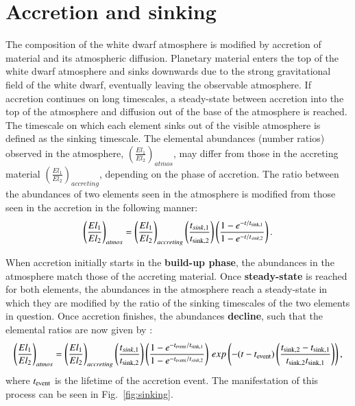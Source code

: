 \documentclass[onecolumn,authoryear]{els-mrw}
\begin{document}
    \section{Accretion and sinking}
The composition of the white dwarf atmosphere is modified by accretion of material and its atmospheric diffusion. Planetary material enters the top of the white dwarf atmosphere and sinks downwards due to the strong gravitational field of the white dwarf, eventually leaving the observable atmosphere. If accretion continues on long timescales, a steady-state between accretion into the top of the atmosphere and diffusion out of the base of the atmosphere is reached. The timescale on which each element sinks out of the visible atmosphere is defined as the sinking timescale. The elemental abundances (number ratios) observed in the atmosphere, $\left (\frac{El_1}{El_2}\right)_{atmos}$, may differ from those in the accreting material $\left (\frac{El_1}{El_2}\right)_{accreting}$, depending on the phase of accretion. The ratio between the abundances of two elements seen in the atmosphere is modified from those seen in the accretion in the following manner: 
\begin{equation}
    \left (\frac{El_1}{El_2}\right)_{atmos} = \left (\frac{El_1}{El_2}\right)_{accreting} \left (\frac{t_{sink, 1}}{t_{\rm sink, 2}}\right) \left ( \frac{ 1-e^{-t/t_{\rm sink, 1}}}{1-e^{-t/t_{sink,2}}}   \right). 
\end{equation}


When accretion initially starts in the {\bf build-up phase}, the abundances in the atmosphere match those of the accreting material. Once {\bf steady-state} is reached for both elements, the abundances in the atmosphere reach a steady-state in which they are modified by the ratio of the sinking timescales of the two elements in question. Once accretion finishes, the abundances {\bf decline}, such that the elemental ratios are now given by :
\begin{equation}
    \left (\frac{El_1}{El_2}\right)_{atmos} = \left (\frac{El_1}{El_2}\right)_{accreting} \left (\frac{t_{sink, 1}}{t_{\rm sink, 2}}\right)    
    \left ( \frac{ 1-e^{-t_{\rm event}/t_{\rm sink, 1}}}{1-e^{-t_{\rm event}/t_{sink,2}}}   \right)
    \, exp\left({-(t- t_{\rm event})}\left(\frac{t_{\rm sink, 2}- t_{\rm sink, 1}}{t_{\rm sink, 2}{t_{\rm sink, 1}}}\right )\right), 
\end{equation}
where $t_{\rm event}$ is the lifetime of the accretion event. The manifestation of this process can be seen in Fig.~\ref{fig:sinking}. 
\end{document}
